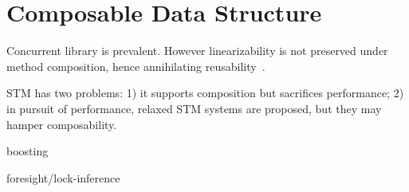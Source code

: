 \documentclass{IEEEtran}
\begin{document}
\section{Composable Data Structure}

Concurrent library is prevalent. However linearizability is not preserved under method composition, hence annihilating reusability~\cite{gramoli2013composing}.

STM has two problems: 1) it supports composition but sacrifices performance; 2) in pursuit of performance, relaxed STM systems are proposed, but they may hamper composability.

boosting

foresight/lock-inference



\end{document}
